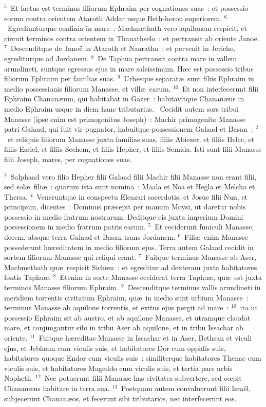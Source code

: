 ${}^{5}$~Et factus est terminus filiorum Ephraim per cognationes suas~: et possessio eorum contra orientem Ataroth Addar usque Beth-horon superiorem.
${}^{6}$~Egrediunturque confinia in mare~: Machmethath vero aquilonem respicit, et circuit terminos contra orientem in Thanathselo~: et pertransit ab oriente Jano\"e.
${}^{7}$~Descenditque de Jano\"e in Ataroth et Naaratha~: et pervenit in Jericho, egrediturque ad Jordanem.
${}^{8}$~De Taphua pertransit contra mare in vallem arundineti, suntque egressus ejus in mare salsissimum. H\ae c est possessio tribus filiorum Ephraim per familias suas.
${}^{9}$~Urbesque separat\ae\ sunt filiis Ephraim in medio possessionis filiorum Manasse, et vill\ae\ earum.
${}^{10}$~Et non interfecerunt filii Ephraim Chanan\ae um, qui habitabat in Gazer~: habitavitque Chanan\ae us in medio Ephraim usque in diem hanc tributarius.
~\lettrine[lines=10,image=true,loversize=0.05,lraise=-0.03]{C}{}ecidit autem sors tribui Manasse (ipse enim est primogenitus Joseph)~: Machir primogenito Manasse patri Galaad, qui fuit vir pugnator, habuitque possessionem Galaad et Basan~:
${}^{2}$~et reliquis filiorum Manasse juxta familias suas, filiis Abiezer, et filiis Helec, et filiis Esriel, et filiis Sechem, et filiis Hepher, et filiis Semida. Isti sunt filii Manasse filii Joseph, mares, per cognationes suas.


${}^{3}$~Salphaad vero filio Hepher filii Galaad filii Machir filii Manasse non erant filii, sed sol\ae\ fili\ae~: quarum ista sunt nomina~: Maala et Noa et Hegla et Melcha et Thersa.
${}^{4}$~Veneruntque in conspectu Eleazari sacerdotis, et Josue filii Nun, et principum, dicentes~: Dominus pr\ae cepit per manum Moysi, ut daretur nobis possessio in medio fratrum nostrorum. Deditque eis juxta imperium Domini possessionem in medio fratrum patris earum.
${}^{5}$~Et ceciderunt funiculi Manasse, decem, absque terra Galaad et Basan trans Jordanem.
${}^{6}$~Fili\ae\ enim Manasse possederunt h\ae reditatem in medio filiorum ejus. Terra autem Galaad cecidit in sortem filiorum Manasse qui reliqui erant.
${}^{7}$~Fuitque terminus Manasse ab Aser, Machmethath qu\ae\ respicit Sichem~: et egreditur ad dexteram juxta habitatores fontis Taphu\ae .
${}^{8}$~Etenim in sorte Manasse ceciderat terra Taphu\ae , qu\ae\ est juxta terminos Manasse filiorum Ephraim.
${}^{9}$~Descenditque terminus vallis arundineti in meridiem torrentis civitatum Ephraim, qu\ae\ in medio sunt urbium Manasse~: terminus Manasse ab aquilone torrentis, et exitus ejus pergit ad mare~:
${}^{10}$~ita ut possessio Ephraim sit ab austro, et ab aquilone Manasse, et utramque claudat mare, et conjungantur sibi in tribu Aser ab aquilone, et in tribu Issachar ab oriente.
${}^{11}$~Fuitque h\ae reditas Manasse in Issachar et in Aser, Bethsan et viculi ejus, et Jeblaam cum viculis suis, et habitatores Dor cum oppidis suis, habitatores quoque Endor cum viculis suis~: similiterque habitatores Thenac cum viculis suis, et habitatores Mageddo cum viculis suis, et tertia pars urbis Nopheth.
${}^{12}$~Nec potuerunt filii Manasse has civitates subvertere, sed cœpit Chanan\ae us habitare in terra sua.
${}^{13}$~Postquam autem convaluerunt filii Isra\"el, subjecerunt Chanan\ae os, et fecerunt sibi tributarios, nec interfecerunt eos.


